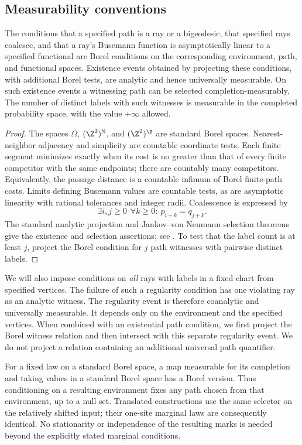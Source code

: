 \subsection{Measurability conventions}
\begin{lemma}\label{lem:measurable}
The conditions that a specified path is a ray or a bigeodesic,
that specified rays coalesce, and that a ray's Busemann function is
asymptotically linear to a specified functional are Borel conditions
on the corresponding environment, path, and functional spaces.
Existence events obtained by projecting these conditions, with
additional Borel tests, are analytic and hence universally measurable.
On such existence events a witnessing path can be selected
completion-measurably.
The number of distinct labels with such witnesses is measurable in
the completed probability space, with the value \(+\infty\) allowed.
\end{lemma}
\begin{proof}
The spaces \(\Omega\), \((\Z^2)^{\mathbb N}\), and
\((\Z^2)^{\Z}\) are standard Borel spaces.
Nearest-neighbor adjacency and simplicity are countable coordinate
tests. Each finite segment minimizes exactly when its cost is no
greater than that of every finite competitor with the same endpoints;
there are countably many competitors. Equivalently, the passage
distance is a countable infimum of Borel finite-path costs.
Limits defining Busemann values are countable tests, as are
asymptotic linearity with rational tolerances and integer radii.
Coalescence is expressed by
\[
 \exists i,j\ge0\ \ \forall k\ge0:\ p_{i+k}=q_{j+k}.
\]
The standard analytic projection and Jankov--von Neumann selection
theorems give the existence and selection assertions; see
\cite[Theorems 29.7 and 29.9]{Kechris}.
To test that the label count is at least \(j\), project the Borel
condition for \(j\) path witnesses with pairwise distinct labels.
\end{proof}

We will also impose conditions on \emph{all} rays with labels in a
fixed chart from specified vertices. The failure of such a regularity
condition has one violating ray as an analytic witness.
The regularity event is therefore coanalytic and universally measurable.
It depends only on the environment and the specified vertices.
When combined with an existential path condition, we first project the
Borel witness relation and then intersect with this separate regularity
event. We do not project a relation containing an additional universal
path quantifier.

For a fixed law on a standard Borel space, a map measurable for its
completion and taking values in a standard Borel space has a Borel
version. Thus conditioning on a resulting environment fixes any path
chosen from that environment, up to a null set. Translated constructions
use the same selector on the relatively shifted input; their one-site
marginal laws are consequently identical. No stationarity or
independence of the resulting marks is needed beyond the explicitly
stated marginal conditions.

